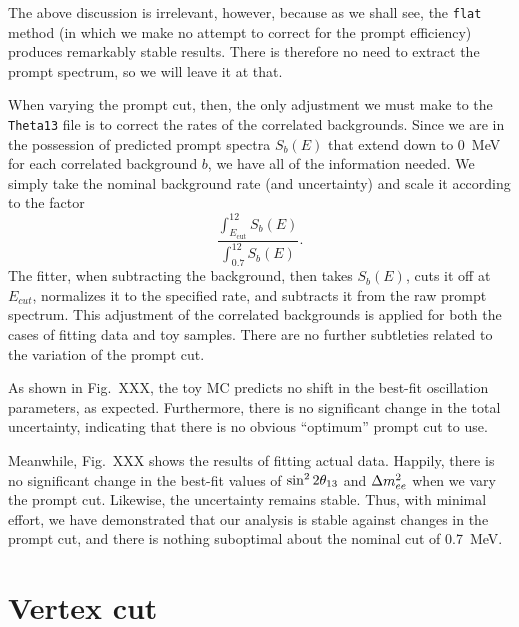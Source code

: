 \documentclass[../thesis.tex]{subfiles}
\begin{document}
The above discussion is irrelevant, however, because as we shall see, the \texttt{flat} method (in which we make no attempt to correct for the prompt efficiency) produces remarkably stable results. There is therefore no need to extract the prompt spectrum, so we will leave it at that.

When varying the prompt cut, then, the only adjustment we must make to the \texttt{Theta13} file is to correct the rates of the correlated backgrounds. Since we are in the possession of predicted prompt spectra $S_b(E)$ that extend down to 0~MeV for each correlated background $b$, we have all of the information needed. We simply take the nominal background rate (and uncertainty) and scale it according to the factor
\[
  \frac{\int_{E_{\mathrm{cut}}}^{12} S_b(E)}{\int_{0.7}^{12} S_b(E)}.
\]
The fitter, when subtracting the background, then takes $S_b(E)$, cuts it off at $E_{cut}$, normalizes it to the specified rate, and subtracts it from the raw prompt spectrum. This adjustment of the correlated backgrounds is applied for both the cases of fitting data and toy samples. There are no further subtleties related to the variation of the prompt cut.

As shown in Fig.~XXX, the toy MC predicts no shift in the best-fit oscillation parameters, as expected. Furthermore, there is no significant change in the total uncertainty, indicating that there is no obvious ``optimum'' prompt cut to use.

Meanwhile, Fig.~XXX shows the results of fitting actual data. Happily, there is no significant change in the best-fit values of $\sin^2 2\theta_{13}$ and $\Delta m^2_{ee}$ when we vary the prompt cut. Likewise, the uncertainty remains stable. Thus, with minimal effort, we have demonstrated that our analysis is stable against changes in the prompt cut, and there is nothing suboptimal about the nominal cut of 0.7~MeV.

\section{Vertex cut}
\label{sec:cutVaryVertexCut}
\end{document}
